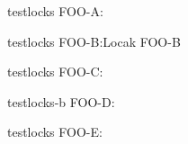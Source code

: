 \documentclass{article}
\def\fooB{Locak FOO-B}
\begin{document}
testlocks FOO-A:\fooA

testlocks FOO-B:\fooB

testlocks FOO-C:\fooC

testlocks-b FOO-D:\fooD

testlocks FOO-E:\fooE
\end{document}
